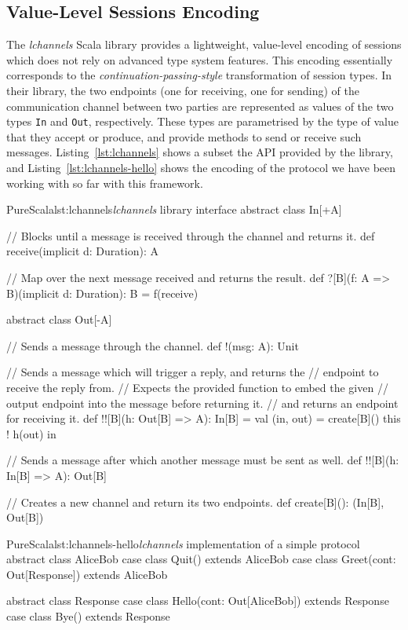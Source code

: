 \documentclass[a4paper,twoside]{article}
\newcommand{\RefCode}[1]{Listing~\ref{#1}}
\newcommand{\stt}[1]{\texttt{\small{#1}}}
\begin{document}
\subsection{Value-Level Sessions Encoding}

The \textit{lchannels} Scala library \cite{lchannels} provides a lightweight, value-level encoding of sessions which does not rely on advanced type system features. This encoding essentially corresponds to the \textit{continuation-passing-style} transformation of session types. In their library, the two endpoints (one for receiving, one for sending) of the communication channel between two parties are represented as values of the two types \stt{In} and \stt{Out}, respectively. These types are parametrised by the type of value that they accept or produce, and provide methods to send or receive such messages. \RefCode{lst:lchannels} shows a subset the API provided by the library, and \RefCode{lst:lchannels-hello} shows the encoding of the protocol we have been working with so far with this framework.

\begin{Code}{PureScala}{lst:lchannels}{\textit{lchannels} library interface}
abstract class In[+A] {
  // Blocks until a message is received through the channel and returns it.
  def receive(implicit d: Duration): A
  
  // Map over the next message received and returns the result.
  def ?[B](f: A => B)(implicit d: Duration): B = {
    f(receive)
  }
}

abstract class Out[-A] {
  // Sends a message through the channel.
  def !(msg: A): Unit

  // Sends a message which will trigger a reply, and returns the
  // endpoint to receive the reply from.
  // Expects the provided function to embed the given
  // output endpoint into the message before returning it.
  // and returns an endpoint for receiving it.
  def !![B](h: Out[B] => A): In[B] = {
    val (in, out) = create[B]()
    this ! h(out)
    in
  }
  
  // Sends a message after which another message must be sent as well.
  def !![B](h: In[B] => A): Out[B]

  // Creates a new channel and return its two endpoints.
  def create[B](): (In[B], Out[B])
}
\end{Code}

\begin{Code}{PureScala}{lst:lchannels-hello}{\textit{lchannels} implementation of a simple protocol}
abstract class AliceBob
case class Quit()                     extends AliceBob
case class Greet(cont: Out[Response]) extends AliceBob

abstract class Response
case class Hello(cont: Out[AliceBob]) extends Response
case class Bye()                      extends Response\
\end{Code}
\end{document}
